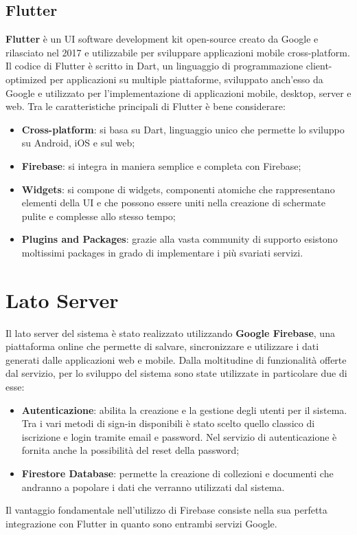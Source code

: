 \documentclass[12pt,a4paper,twoside,openright,titlepage]{book}
\begin{document}
\subsection{Flutter}
\textbf{Flutter} è un UI software development kit open-source creato da Google e rilasciato nel 2017 e utilizzabile per sviluppare applicazioni mobile cross-platform. Il codice di Flutter è scritto in Dart, un linguaggio di programmazione client-optimized per applicazioni su multiple piattaforme, sviluppato anch'esso da Google e utilizzato per l'implementazione di applicazioni mobile, desktop, server e web. Tra le caratteristiche principali di Flutter è bene considerare:
\begin{itemize}
\item \textbf{Cross-platform}: si basa su Dart, linguaggio unico che permette lo sviluppo su Android, iOS e sul web;
\item \textbf{Firebase}: si integra in maniera semplice e completa con Firebase;
\item \textbf{Widgets}: si compone di widgets, componenti atomiche che rappresentano elementi della UI e che possono essere uniti nella creazione di schermate pulite e complesse allo stesso tempo; 
\item \textbf{Plugins and Packages}: grazie alla vasta community di supporto esistono moltissimi packages in grado di implementare i più svariati servizi.
\end{itemize}

\section{Lato Server}
Il lato server del sistema è stato realizzato utilizzando \textbf{Google Firebase}, una piattaforma online che permette di salvare, sincronizzare e utilizzare i dati generati dalle applicazioni web e mobile. Dalla moltitudine di funzionalità offerte dal servizio, per lo sviluppo del sistema sono state utilizzate in particolare due di esse:
\begin{itemize}
\item \textbf{Autenticazione}: abilita la creazione e la gestione degli utenti per il sistema. Tra i vari metodi di sign-in disponibili è stato scelto quello classico di iscrizione e login tramite email e password. Nel servizio di autenticazione è fornita anche la possibilità del reset della password;
\item \textbf{Firestore Database}: permette la creazione di collezioni e documenti che andranno a popolare i dati che verranno utilizzati dal sistema.
\end{itemize}
Il vantaggio fondamentale nell'utilizzo di Firebase consiste nella sua perfetta integrazione con Flutter in quanto sono entrambi servizi Google.
\end{document}
